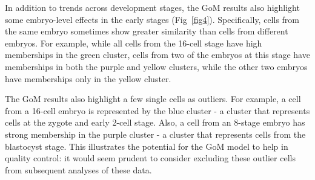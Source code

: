\documentclass[10pt,letterpaper]{article}
\begin{document}


%

In addition to trends across development stages, the GoM results also highlight some embryo-level effects in the early stages (Fig~\ref{fig4}). Specifically, cells from the same embryo sometimes show greater similarity than cells from different embryos. For example, while all cells from the 16-cell stage have high memberships in the green cluster, cells from two of the embryos at this stage have memberships in both the purple and yellow clusters, while the other two embryos have memberships only in the yellow cluster.

The GoM results also highlight a few single cells as outliers. For example, a cell from a 16-cell embryo is represented by the blue cluster - a cluster that represents cells at the zygote and early 2-cell stage. Also, a cell from an 8-stage embryo has strong membership in the purple cluster - a cluster that represents cells from the blastocyst stage.
This illustrates the potential for the GoM model to help in quality control: it would seem prudent to consider excluding these outlier cells from subsequent analyses of these data.
\end{document}
